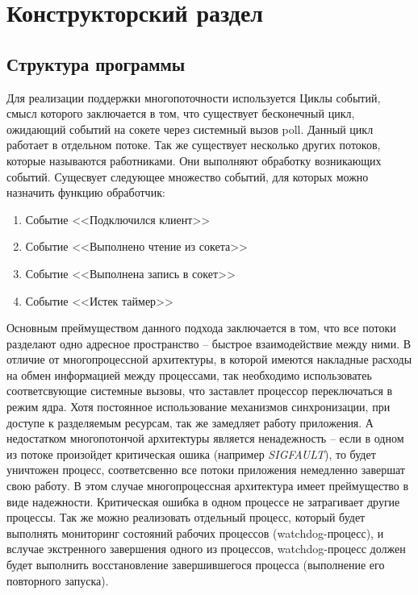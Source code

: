 \documentclass[a4paper,12pt]{report}
\begin{document}
	 	\chapter{Конструкторский раздел}
	     \section{Структура программы}

    Для реализации поддержки многопоточности используется Циклы событий, смысл которого заключается в том, что существует бесконечный цикл, ожидающий событий на сокете через системный вызов poll. Данный цикл работает в отдельном потоке. Так же существует несколько других потоков, которые называются работниками. Они выполняют обработку возникающих событий. Сущесвует следующее множество событий, для которых можно назначить функцию обработчик:
    \begin{enumerate}
        \item Событие <<Подключился клиент>>
        \item Событие <<Выполнено чтение из сокета>>
        \item Событие <<Выполнена запись в сокет>>
        \item Событие <<Истек таймер>>
    \end{enumerate}
    
    Основным преймуществом данного подхода заключается в том, что все потоки разделают одно адресное пространство -- быстрое взаимодействие между ними. В отличие от многопроцессной архитектуры, в которой имеются накладные расходы на обмен информацией между процессами, так необходимо использоватеь соответсвующие системные вызовы, что заставлет процессор переключаться в режим ядра. Хотя постоянное использование механизмов синхронизации, при доступе к разделяемым ресурсам, так же замедляет работу приложения. А недостатком многопотончой архитектуры является ненадежность -- если в одном из потоке произойдет критическая ошика (например \textit{SIGFAULT}), то будет уничтожен процесс, соответсвенно все потоки приложения немедленно завершат свою работу. В этом случае многопроцессная архитектура имеет преймущество в виде надежности. Критическая ошибка в одном процессе не затрагивает другие процессы. Так же можно реализовать отдельный процесс, который будет выполнять мониторинг состояний рабочих процессов (watchdog-процесс), и вслучае экстренного завершения одного из процессов, watchdog-процесс должен будет выполнить восстановление завершившегося процесса (выполнение его повторного запуска). 
    
\end{document}
